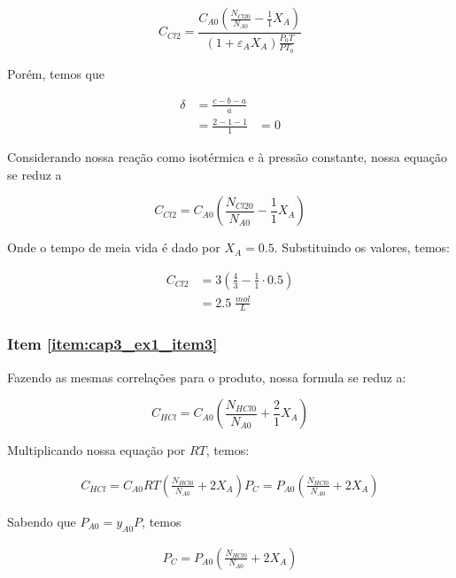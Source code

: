 \begin{equation*}
    C_{Cl2} = \frac{C_{A0} \left( \frac{N_{Cl20}}{N_{A0} } - \frac{1}{1}X_A \right)}{\left( 1 + \varepsilon_A X_A \right) \frac{P_0T}{PT_0} }
\end{equation*}

Porém, temos que

\begin{align*}
    \delta &= \frac{c - b - a}{a}\\
    &= \frac{2 - 1 - 1}{1}
    &= 0
\end{align*}

Considerando nossa reação como isotérmica e à pressão constante, nossa equação se reduz a

\begin{equation*}
    C_{Cl2} = C_{A0} \left( \frac{N_{Cl20}}{N_{A0} } - \frac{1}{1}X_A \right)
\end{equation*}

Onde o tempo de meia vida é dado por \(X_A = 0.5\). Substituindo os valores, temos:

\begin{align*}
    C_{Cl2} &= 3 \left( \frac{4}{3} - \frac{1}{1} \cdot 0.5 \right) \\
    &= 2.5 \; \frac{mol}{L}
\end{align*}

\subsubsection{Item \ref{item:cap3_ex1_item3}}

Fazendo as mesmas correlações para o produto, nossa formula se reduz a:

\begin{equation*}
    C_{HCl} = C_{A0} \left( \frac{N_{HCl0}}{N_{A0}} + \frac{2}{1}X_A \right)
\end{equation*}

Multiplicando nossa equação por \(RT\), temos:

\begin{align*}
    C_{HCl} = C_{A0} RT \left( \frac{N_{HCl0}}{N_{A0}} + 2 X_A \right)
    P_C = P_{A0} \left( \frac{N_{HCl0}}{N_{A0}} + 2 X_A \right)
\end{align*}

Sabendo que \(P_{A0}  = y_{A0} P\), temos

\begin{align*}
    P_C = P_{A0} \left( \frac{N_{HCl0}}{N_{A0}} + 2 X_A \right)
\end{align*}
